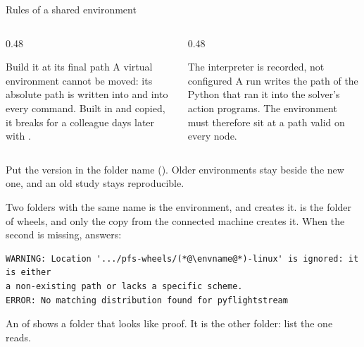 \documentclass[aspectratio=169,11pt]{beamer}
\begin{document}
\begin{frame}{Rules of a shared environment}
\begin{columns}[T]
\begin{column}{0.48\textwidth}
\begin{alertblock}{Build it at its final path}
\small A virtual environment cannot be moved: its absolute path is written
into  and into every command. Built in  and copied,
it breaks for a colleague days later with .
\end{alertblock}
\end{column}
\begin{column}{0.48\textwidth}
\begin{block}{The interpreter is recorded, not configured}
\small A run writes the path of the Python that ran it into the solver's
action programs. The environment must therefore sit at a path valid on every
node.
\end{block}
\end{column}
\end{columns}
\vspace{2mm}
\begin{takeaway}Put the version in the folder name (\code{\envname}). Older
environments stay beside the new one, and an old study stays
reproducible.\end{takeaway}
\end{frame}

\begin{frame}[fragile]{Two folders with the same name}
\small {} is the environment, and  creates it.
 is the folder of wheels, and only the copy from the
connected machine creates it. When the second is missing,  answers:
\begin{lstlisting}[style=ftsbase]
WARNING: Location '.../pfs-wheels/(*@\envname@*)-linux' is ignored: it is either
a non-existing path or lacks a specific scheme.
ERROR: No matching distribution found for pyflightstream
\end{lstlisting}
\begin{takeaway}An  of  shows a folder that looks like
proof. It is the other folder: list the one  reads.\end{takeaway}
\end{frame}
\end{document}
